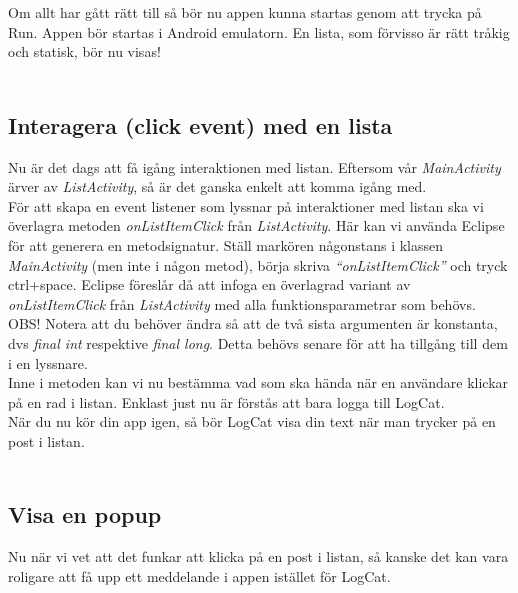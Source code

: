 \documentclass[11 pt, titlepage]{article} %
\begin{document}
Om allt har gått rätt till så bör nu appen kunna startas genom att trycka på Run. Appen bör startas i Android emulatorn. En lista, som förvisso är rätt tråkig och statisk, bör nu visas!\\ \\


\subsection{Interagera (click event) med en lista}
Nu är det dags att få igång interaktionen med listan. Eftersom vår \textit{MainActivity} ärver av \textit{ListActivity}, så är det ganska enkelt att komma igång med.\\

För att skapa en event listener som lyssnar på interaktioner med listan ska vi överlagra metoden \textit{onListItemClick} från \textit{ListActivity}. Här kan vi använda Eclipse för att generera en metodsignatur. Ställ markören någonstans i klassen \textit{MainActivity} (men inte i någon metod), börja skriva \textit{“onListItemClick”} och tryck ctrl+space. Eclipse föreslår då att infoga en överlagrad variant av \textit{onListItemClick} från \textit{ListActivity} med alla funktionsparametrar som behövs.\\

OBS! Notera att du behöver ändra så att de två sista argumenten är konstanta, dvs \textit{final int} respektive \textit{final long}. Detta behövs senare för att ha tillgång till dem i en lyssnare.\\

Inne i metoden kan vi nu bestämma vad som ska hända när en användare klickar på en rad i listan. Enklast just nu är förstås att bara logga till LogCat.\\

När du nu kör din app igen, så bör LogCat visa din text när man trycker på en post i listan.\\ \\
\subsection{Visa en popup}
Nu när vi vet att det funkar att klicka på en post i listan, så kanske det kan vara roligare att få upp ett meddelande i appen istället för LogCat.\\
\end{document}
